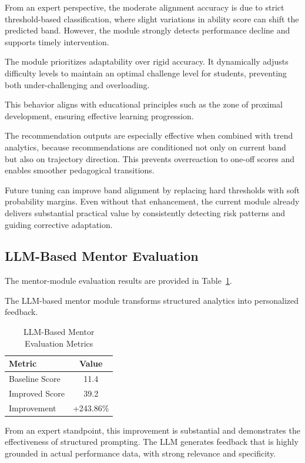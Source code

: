 \begin{sloppypar}
From an expert perspective, the moderate alignment accuracy is due to strict threshold-based classification, where slight variations in ability score can shift the predicted band. However, the module strongly detects performance decline and supports timely intervention.

The module prioritizes adaptability over rigid accuracy. It dynamically adjusts difficulty levels to maintain an optimal challenge level for students, preventing both under-challenging and overloading.

This behavior aligns with educational principles such as the zone of proximal development, ensuring effective learning progression.

The recommendation outputs are especially effective when combined with trend analytics, because recommendations are conditioned not only on current band but also on trajectory direction. This prevents overreaction to one-off scores and enables smoother pedagogical transitions.

Future tuning can improve band alignment by replacing hard thresholds with soft probability margins. Even without that enhancement, the current module already delivers substantial practical value by consistently detecting risk patterns and guiding corrective adaptation.

\subsection{LLM-Based Mentor Evaluation}

The mentor-module evaluation results are provided in Table~\ref{tab:llm_mentor_metrics}.

The LLM-based mentor module transforms structured analytics into personalized feedback.

\begin{table}[H]
\centering
\caption{LLM-Based Mentor Evaluation Metrics}
\label{tab:llm_mentor_metrics}
\begin{tabular}{|l|c|}
\hline
Metric & Value \\
\hline
Baseline Score & 11.4 \\
\hline
Improved Score & 39.2 \\
\hline
Improvement & +243.86\% \\
\hline
\end{tabular}
\end{table}

From an expert standpoint, this improvement is substantial and demonstrates the effectiveness of structured prompting. The LLM generates feedback that is highly grounded in actual performance data, with strong relevance and specificity.


\end{sloppypar}
